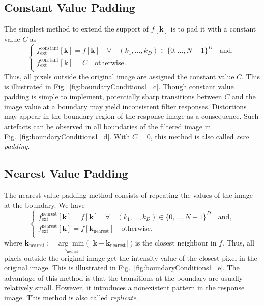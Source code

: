 \documentclass[fleqn,a4paper,oneside,openany]{book}
\begin{document}
\subsection{Constant Value Padding}\label{sec:constantValuePadding}
%
The simplest method to extend the support of $f[\boldsymbol{k}]$ is to pad it with a constant value $C$ as
$$
\begin{cases}
f_{\text{ext}}^{\text{constant}}[\boldsymbol{k}]=f[\boldsymbol{k}] \quad\forall\quad (k_1,\dots,k_D)\in \{0,\dots,N-1\}^D \quad \text{and},\\
f_{\text{ext}}^{\text{constant}}[\boldsymbol{k}]=C \quad \text{otherwise}. \\
\end{cases}
$$
Thus, all pixels outside the original image are assigned the constant value $C$. This is illustrated in Fig.~\ref{fig:boundaryConditions1_c}.
Though constant value padding is simple to implement, potentially sharp transitions between $C$ and the image value at a boundary may yield inconsistent filter responses.
Distortions may appear in the boundary region of the response image as a consequence.
Such artefacts can be observed in all boundaries of the filtered image in Fig.~\ref{fig:boundaryConditions1_d}.
With $C=0$, this method is also called \textit{zero padding}.
%
\subsection{Nearest Value Padding}
%
The nearest value padding method consists of repeating the values of the image at the boundary.
We have 
$$
\begin{cases}
f_{\text{ext}}^{\text{nearest}}[\boldsymbol{k}]=f[\boldsymbol{k}] \quad\forall\quad (k_1,\dots,k_D)\in \{0,\dots,N-1\}^D \quad \text{and},\\
f_{\text{ext}}^{\text{nearest}}[\boldsymbol{k}]=f[\boldsymbol{k}_{\text{nearest}}] \quad \text{otherwise},\\
\end{cases}
$$
where $\boldsymbol{k}_{\text{nearest}}:=\underset{\boldsymbol{k}_{\text{nearest}}}{\arg\min} \biggl(||\boldsymbol{k}-\boldsymbol{k}_{\text{nearest}}|| \biggr)$ is the closest neighbour in $f$. Thus, all pixels outside the original image get the intensity value of the closest pixel in the original image.
This is illustrated in Fig.~\ref{fig:boundaryConditions1_e}.
The advantage of this method is that the transitions at the boundary are usually relatively small.
However, it introduces a nonexistent pattern in the response image.
This method is also called \textit{replicate}.
%
\end{document}
